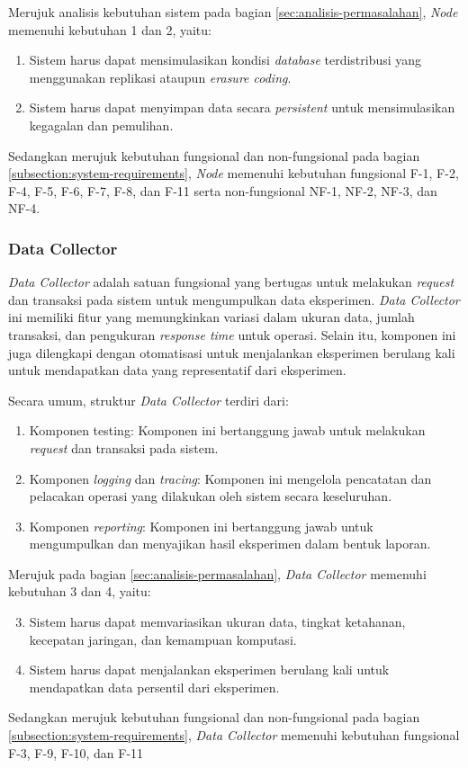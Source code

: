 Merujuk analisis kebutuhan sistem pada bagian \ref{sec:analisis-permasalahan}, \textit{Node} memenuhi kebutuhan 1 dan 2, yaitu:

\begin{enumerate}
    \item Sistem harus dapat mensimulasikan kondisi \textit{database} terdistribusi yang menggunakan replikasi ataupun \textit{erasure coding}.
    \item Sistem harus dapat menyimpan data secara \textit{persistent} untuk mensimulasikan kegagalan dan pemulihan.
\end{enumerate}

Sedangkan merujuk kebutuhan fungsional dan non-fungsional pada bagian \ref{subsection:system-requirements}, \textit{Node} memenuhi kebutuhan fungsional F-1, F-2, F-4, F-5, F-6, F-7, F-8, dan F-11 serta non-fungsional NF-1, NF-2, NF-3, dan NF-4.

\subsubsection{Data Collector}
\label{subsubsection:data-collector}

\textit{Data Collector} adalah satuan fungsional yang bertugas untuk melakukan \textit{request} dan transaksi pada sistem untuk mengumpulkan data eksperimen. \textit{Data Collector} ini memiliki fitur yang memungkinkan variasi dalam ukuran data, jumlah transaksi, dan pengukuran \textit{response time} untuk operasi. Selain itu, komponen ini juga dilengkapi dengan otomatisasi untuk menjalankan eksperimen berulang kali untuk mendapatkan data yang representatif dari eksperimen.

Secara umum, struktur \textit{Data Collector} terdiri dari:

\begin{enumerate}
    \item Komponen testing: Komponen ini bertanggung jawab untuk melakukan \textit{request} dan transaksi pada sistem.
    \item Komponen \textit{logging} dan \textit{tracing}: Komponen ini mengelola pencatatan dan pelacakan operasi yang dilakukan oleh sistem secara keseluruhan.
    \item Komponen \textit{reporting}: Komponen ini bertanggung jawab untuk mengumpulkan dan menyajikan hasil eksperimen dalam bentuk laporan.
\end{enumerate}

Merujuk pada bagian \ref{sec:analisis-permasalahan}, \textit{Data Collector} memenuhi kebutuhan 3 dan 4, yaitu:

\begin{enumerate}
    \setcounter{enumi}{2}
    \item Sistem harus dapat memvariasikan ukuran data, tingkat ketahanan, kecepatan jaringan, dan kemampuan komputasi.
    \item Sistem harus dapat menjalankan eksperimen berulang kali untuk mendapatkan data persentil dari eksperimen.
\end{enumerate}

Sedangkan merujuk kebutuhan fungsional dan non-fungsional pada bagian \ref{subsection:system-requirements}, \textit{Data Collector} memenuhi kebutuhan fungsional F-3, F-9, F-10, dan F-11
